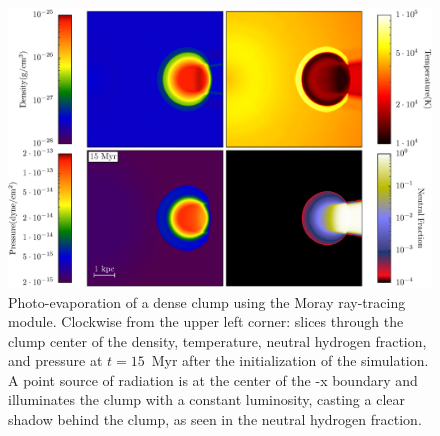 \begin{figure}
  \centering
  \includegraphics[width=1.0\textwidth]{figures/code-test-shadowing.eps}
  \caption{Photo-evaporation of a dense clump using the Moray
ray-tracing module.  Clockwise from the upper left corner: slices
through the clump center of the density, temperature, neutral hydrogen
fraction, and pressure at $t=15$~Myr after the initialization of the
simulation.  A point source of radiation is at the center of the -x
boundary and illuminates the clump with a constant luminosity, casting
a clear shadow behind the clump, as seen in the neutral hydrogen
fraction.}
  \label{fig:shadowing}
\end{figure}
